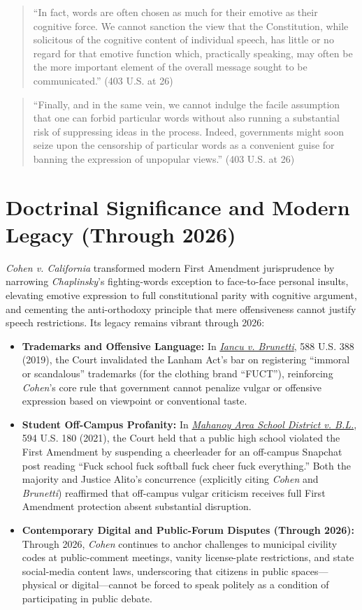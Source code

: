 \documentclass[12pt]{article}
\begin{document}
\begin{quote}
``In fact, words are often chosen as much for their emotive as their cognitive force. We cannot sanction the view that the Constitution, while solicitous of the cognitive content of individual speech, has little or no regard for that emotive function which, practically speaking, may often be the more important element of the overall message sought to be communicated.'' (403 U.S. at 26)
\end{quote}

\begin{quote}
``Finally, and in the same vein, we cannot indulge the facile assumption that one can forbid particular words without also running a substantial risk of suppressing ideas in the process. Indeed, governments might soon seize upon the censorship of particular words as a convenient guise for banning the expression of unpopular views.'' (403 U.S. at 26)
\end{quote}

\section{Doctrinal Significance and Modern Legacy (Through 2026)}
\textit{Cohen v. California} transformed modern First Amendment jurisprudence by narrowing \textit{Chaplinsky}'s fighting-words exception to face-to-face personal insults, elevating emotive expression to full constitutional parity with cognitive argument, and cementing the anti-orthodoxy principle that mere offensiveness cannot justify speech restrictions. Its legacy remains vibrant through 2026:
\begin{itemize}
  \item \textbf{Trademarks and Offensive Language:} In \href{https://supreme.justia.com/cases/federal/us/588/18-302/}{\textit{Iancu v. Brunetti}}, 588 U.S. 388 (2019), the Court invalidated the Lanham Act's bar on registering ``immoral or scandalous'' trademarks (for the clothing brand ``FUCT''), reinforcing \textit{Cohen}'s core rule that government cannot penalize vulgar or offensive expression based on viewpoint or conventional taste.
  \item \textbf{Student Off-Campus Profanity:} In \href{https://supreme.justia.com/cases/federal/us/594/20-255/}{\textit{Mahanoy Area School District v. B.L.}}, 594 U.S. 180 (2021), the Court held that a public high school violated the First Amendment by suspending a cheerleader for an off-campus Snapchat post reading ``Fuck school fuck softball fuck cheer fuck everything.'' Both the majority and Justice Alito's concurrence (explicitly citing \textit{Cohen} and \textit{Brunetti}) reaffirmed that off-campus vulgar criticism receives full First Amendment protection absent substantial disruption.
  \item \textbf{Contemporary Digital and Public-Forum Disputes (Through 2026):} Through 2026, \textit{Cohen} continues to anchor challenges to municipal civility codes at public-comment meetings, vanity license-plate restrictions, and state social-media content laws, underscoring that citizens in public spaces---physical or digital---cannot be forced to speak politely as a condition of participating in public debate.
\end{itemize}
\end{document}
